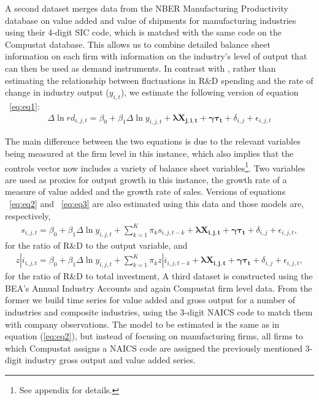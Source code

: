 \documentclass{_latex/house}
\begin{document}
A second dataset merges data from the NBER Manufacturing Productivity database on value added and value of shipments for manufacturing industries using their 4-digit SIC code, which is matched with the same code on the Compustat database. This allows us to combine detailed balance sheet information on each firm with information on the industry's level of output that can then be used as demand instruments. In contrast with \cite{RePEc:aea:aecrev:v:97:y:2007:i:4:p:1131-1164}, rather than estimating the relationship between fluctuations in R\&D spending and the rate of change in industry output ($y_{i,t}$), we estimate the following version of equation ~\ref{eq:eq1}:
\begin{align*}
\Delta \ln rd_{i,j,t}=\beta_{0}+\beta_{1} \Delta \ln y_{i,j,t}+\boldsymbol{\lambda X_{j,i,t}}+\boldsymbol{\gamma \tau_{t}}+\delta_{i,j}+\epsilon_{i,j,t}
\end{align*}

The main difference between the two equations is due to the relevant variables being measured at the firm level in this instance, which also implies that the controls vector now includes a variety of balance sheet variables\footnote{See appendix for details.}. Two variables are used as proxies for output growth in this instance, the growth rate of a measure of value added and the growth rate of sales. Versions of equations ~\ref{eq:eq2} and ~\ref{eq:eq3} are also estimated using this data and those models are, respectively,
\begin{align*}
s_{i,j,t}=\beta_{0}+\beta_{1} \Delta \ln y_{i,j,t}+\sum_{k=1}^{K} \pi_{k} s_{i,j,t-k}+\boldsymbol{\lambda X_{i,j,t}}+\boldsymbol{\gamma \tau_{t}}+\delta_{i,j}+\epsilon_{i,j,t},
\end{align*}
for the ratio of R\&D to the output variable, and
\begin{align*}
z|i_{i,j,t}=\beta_{0}+\beta_{1} \Delta \ln y_{i,j,t}+\sum_{k=1}^{K} \pi_{k} z|i_{i,j,t-k}+\boldsymbol{\lambda X_{i,j,t}}+\boldsymbol{\gamma \tau_{t}}+\delta_{i,j}+\epsilon_{i,j,t},
\end{align*}
for the ratio of R\&D to total investment, A third dataset is constructed using the BEA's Annual Industry Accounts and again Compustat firm level data. From the former we build time series for value added and gross output for a number of industries and composite industries, using the 3-digit NAICS code to match them with company observations. The model to be estimated is the same as in equation (\ref{eq:eq2}), but instead of focusing on manufacturing firms, all firms to which Compustat assigns a NAICS code are assigned the previously mentioned 3-digit industry gross output and value added series.
\end{document}
